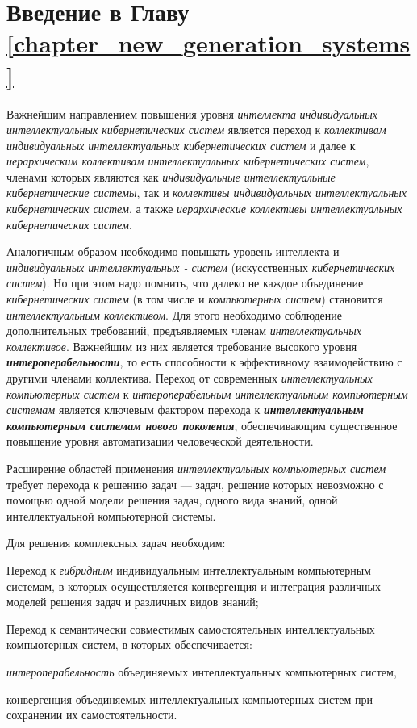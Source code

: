 \section*{Введение в Главу \ref{chapter_new_generation_systems}}

Важнейшим направлением повышения уровня \textit{интеллекта} \textit{индивидуальных интеллектуальных кибернетических систем} является переход к \textit{коллективам индивидуальных интеллектуальных кибернетических систем} и далее к \textit{иерархическим коллективам интеллектуальных кибернетических систем}, членами которых являются как \textit{индивидуальные интеллектуальные кибернетические системы}, так и \textit{коллективы индивидуальных интеллектуальных кибернетических систем}, а также \textit{иерархические коллективы интеллектуальных кибернетических систем}. 

Аналогичным образом необходимо повышать уровень интеллекта и \textit{индивидуальных интеллектуальных - систем} (искусственных \textit{кибернетических систем}). Но при этом надо помнить, что далеко не каждое объединение \textit{ кибернетических систем} (в том числе и \textit{компьютерных систем}) становится \textit{интеллектуальным коллективом}. Для этого необходимо соблюдение дополнительных требований, предъявляемых  членам \textit{интеллектуальных коллективов}. Важнейшим из них является требование высокого уровня \textbf{\textit{интероперабельности}}, то есть способности к эффективному взаимодействию с другими членами коллектива. Переход от современных \textit{интеллектуальных компьютерных систем} к \textit{интероперабельным интеллектуальным компьютерным системам} является ключевым фактором перехода к \textbf{\textit{интеллектуальным компьютерным системам нового поколения}}, обеспечивающим существенное повышение уровня автоматизации человеческой деятельности.

Расширение областей применения \textit{интеллектуальных компьютерных систем} требует перехода к решению  задач --- задач, решение которых невозможно с помощью одной модели решения задач, одного вида знаний, одной интеллектуальной компьютерной системы.

Для решения комплексных задач необходим:
\begin{textitemize}
	\item Переход к \textit{гибридным} индивидуальным интеллектуальным компьютерным системам, в которых осуществляется конвергенция и интеграция различных моделей решения задач и различных видов знаний;	
	\item Переход к  семантически совместимых самостоятельных интеллектуальных компьютерных систем, в которых обеспечивается:
	\begin{textitemize}
		\item \textit{интероперабельность} объединяемых интеллектуальных компьютерных систем,
		\item конвергенция объединяемых интеллектуальных компьютерных систем при сохранении их самостоятельности.
	\end{textitemize}
\end{textitemize}

